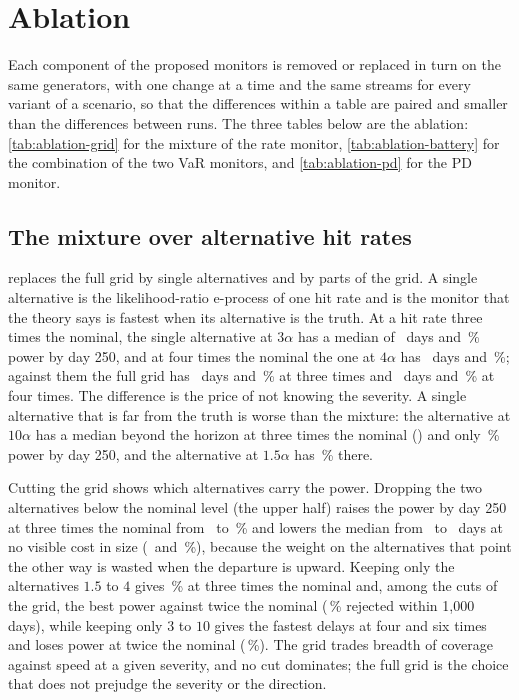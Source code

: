 \section{Ablation}
\label{sec:ablation}

Each component of the proposed monitors is removed or replaced in turn on the same generators, with one change at a time and the same streams for every variant of a scenario, so that the differences within a table are paired and smaller than the differences between runs. The three tables below are the ablation: \cref{tab:ablation-grid} for the mixture of the rate monitor, \cref{tab:ablation-battery} for the combination of the two VaR monitors,
and \cref{tab:ablation-pd} for the PD monitor.

\subsection{The mixture over alternative hit rates}
\label{sec:ablation-mixture}

 replaces the full grid by single alternatives and by parts of the grid. A single alternative is the likelihood-ratio e-process of one hit rate and is the monitor that the theory says is fastest when its alternative is the truth. At a hit rate three times the nominal, the single alternative at $3\alpha$ has a median of \nAbMedThreeSingleThree\ days and \nAbByThreeSingleThree\,\% power by day 250,
and at four times the nominal the one at $4\alpha$ has \nAbMedFourSingleFour\ days and \nAbByFourSingleFour\,\%; against them the full grid has \nAbMedThreeFull\ days and \nAbByThreeFull\,\% at three times and \nAbMedFourFull\ days and \nAbByFourFull\,\% at four times. The difference is the price of not knowing the severity. A single alternative that is far from the truth is worse than the mixture: the alternative at $10\alpha$ has a median beyond the horizon at three times
the nominal (\nAbMedThreeSingleTen) and only \nAbByThreeSingleTen\,\% power by day 250, and the alternative at $1.5\alpha$ has \nAbByThreeSingleOneFive\,\% there.

Cutting the grid shows which alternatives carry the power. Dropping the two alternatives below the nominal level (the upper half) raises the power by day 250 at three times the nominal from \nAbByThreeFull\ to \nAbByThreeUpper\,\% and lowers the median from \nAbMedThreeFull\ to \nAbMedThreeUpper\ days at no visible cost in size (\nAbNullFull\ and \nAbNullUpper\,\%), because the weight on the alternatives that point the other way is wasted when the departure is upward.
Keeping only the alternatives $1.5$ to $4$ gives \nAbByThreeUpperLow\,\% at three times the nominal and, among the cuts of the grid, the best power against twice the nominal (\nAbEverTwoUpperLow\,\% rejected within 1,000 days), while keeping only $3$ to $10$ gives the fastest delays at four and six times and loses power at twice the nominal (\nAbEverTwoUpperHigh\,\%). The grid trades breadth of coverage against speed at a given severity, and no cut dominates; the full grid is the choice that does not prejudge the severity or the direction.

